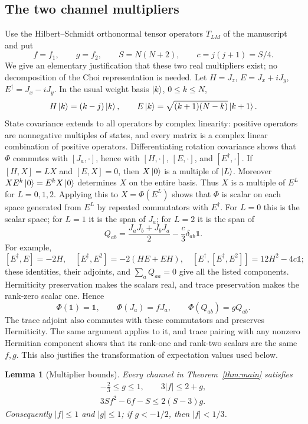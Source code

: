 \documentclass[11pt,a4paper]{article}
\newcommand{\id}{\mathds{1}}
\newtheorem{lemma}{Lemma}
\begin{document}
\subsection{The two channel multipliers}
Use the Hilbert--Schmidt orthonormal tensor operators $T_{LM}$ of the
manuscript and put
\[
 f=f_1,\qquad g=f_2,\qquad S=N(N+2),\qquad c=j(j+1)=S/4.
\]
We give an elementary justification that these two real multipliers exist;
no decomposition of the Choi representation is needed.
Let $H=J_z$, $E=J_x+iJ_y$, $E^\dagger=J_x-iJ_y$. In the usual
weight basis $\ket{k}$, $0\le k\le N$,
\[
 H\ket{k}=(k-j)\ket{k},\qquad
 E\ket{k}=\sqrt{(k+1)(N-k)}\ket{k+1}.
\]
State covariance extends to all operators by complex linearity: positive
operators are nonnegative multiples of states, and every matrix is a
complex linear combination of positive operators. Differentiating
rotation covariance shows that $\Phi$ commutes with
$[J_a,\cdot]$, hence with $[H,\cdot]$, $[E,\cdot]$, and
$[E^\dagger,\cdot]$.
If $[H,X]=LX$ and $[E,X]=0$, then $X\ket{0}$ is a multiple of
$\ket{L}$. Moreover $X E^k\ket{0}=E^kX\ket{0}$ determines $X$
on the entire basis. Thus $X$ is a multiple of $E^L$ for
$L=0,1,2$. Applying this to $X=\Phi(E^L)$ shows that $\Phi$
is scalar on each space generated from $E^L$ by repeated commutators
with $E^\dagger$. For $L=0$ this is the scalar space; for $L=1$
it is the span of $J_a$; for $L=2$ it is the span of
\[
 Q_{ab}=\frac{J_aJ_b+J_bJ_a}{2}-\frac c3\delta_{ab}\id.
\]
For example,
\[
 [E^\dagger,E]=-2H,\quad
 [E^\dagger,E^2]=-2(HE+EH),\quad
 [E^\dagger,[E^\dagger,E^2]]=12H^2-4c\id;
\]
these identities, their adjoints, and $\sum_aQ_{aa}=0$ give all the
listed components.
Hermiticity preservation makes the scalars real, and trace preservation
makes the rank-zero scalar one. Hence
\[
 \Phi(\id)=\id,\qquad \Phi(J_a)=fJ_a,\qquad \Phi(Q_{ab})=gQ_{ab}.
\]
The trace adjoint also commutes with these commutators and preserves
Hermiticity. The same argument applies to it, and trace pairing with
any nonzero Hermitian component shows that its rank-one and rank-two
scalars are the same $f,g$. This also justifies the transformation of
expectation values used below.

\begin{lemma}[Multiplier bounds]\label{t2:lem:multipliers}
Every channel in Theorem~\ref{thm:main} satisfies
\begin{align}
 -\frac23\le g\le1,\qquad 3|f|\le2+g,\label{t2:eq:region}\\
 3Sf^2-6f-S\le2(S-3)g.\label{t2:eq:curved}
\end{align}
Consequently $|f|\le1$ and $|g|\le1$; if $g<-1/2$, then $|f|<1/3$.
\end{lemma}
\end{document}
